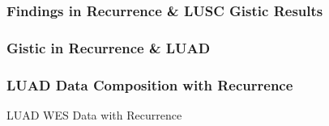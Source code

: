 \documentclass{beamer}
\begin{document}
    \begin{frame}
        \frametitle{Findings in Recurrence \& LUSC Gistic Results}
    \end{frame}

    \subsubsection{Gistic in Recurrence \& LUAD}
    \begin{frame}
        \frametitle{LUAD Data Composition with Recurrence}

        \begin{table}
            \caption{LUAD WES Data with Recurrence}
            \resizebox{!}{0.3 \textheight}
            {}
        \end{table}
    \end{frame}
\end{document}
